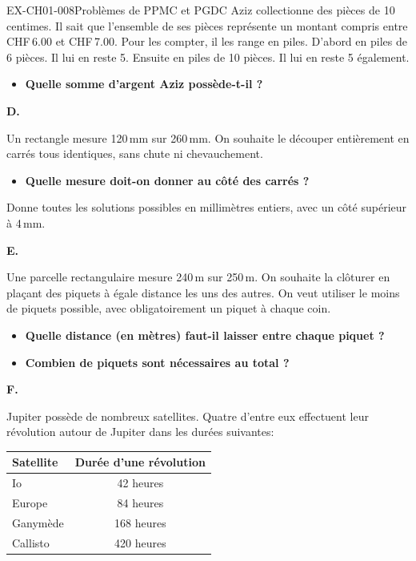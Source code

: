 \begin{exercice}{EX-CH01-008}{Problèmes de PPMC et PGDC}
\medskip
Aziz collectionne des pièces de 10 centimes. Il sait que l'ensemble de ses pièces représente un montant compris entre CHF\,6.00 et CHF\,7.00. Pour les compter, il les range en piles. D'abord en piles de 6 pièces. Il lui en reste 5. Ensuite en piles de 10 pièces. Il lui en reste 5 également.

\begin{itemize}[label=$\blacktriangleright$]
\item \textbf{Quelle somme d'argent Aziz possède-t-il ?}
\end{itemize}

\bigskip\textbf{D.}

\medskip
Un rectangle mesure 120\,mm sur 260\,mm.
On souhaite le découper entièrement en carrés tous identiques, sans chute ni chevauchement.

\begin{itemize}[label=$\blacktriangleright$]
\item \textbf{Quelle mesure doit-on donner au côté des carrés ?}
\end{itemize}

Donne toutes les solutions possibles en millimètres entiers, avec un côté supérieur à 4\,mm.

\bigskip\textbf{E.}

\medskip
Une parcelle rectangulaire mesure 240\,m sur 250\,m. On souhaite la clôturer en plaçant des piquets à égale distance les uns des autres. On veut utiliser le moins de piquets possible, avec obligatoirement un piquet à chaque coin.

\begin{itemize}[label=$\blacktriangleright$]
\item \textbf{Quelle distance (en mètres) faut-il laisser entre chaque piquet ?}
\item \textbf{Combien de piquets sont nécessaires au total ?}
\end{itemize}

\bigskip\textbf{F.}

\medskip
Jupiter possède de nombreux satellites. Quatre d'entre eux effectuent leur révolution autour de Jupiter dans les durées suivantes:

\begin{center}
\begin{tabular}{lc}
    \hline
    \textbf{Satellite} & \textbf{Durée d'une révolution} \\
    \hline
    Io         & 42 heures  \\
    Europe     & 84 heures  \\
    Ganymède   & 168 heures \\
    Callisto   & 420 heures \\
    \hline
\end{tabular}
\end{center}


\end{exercice}
